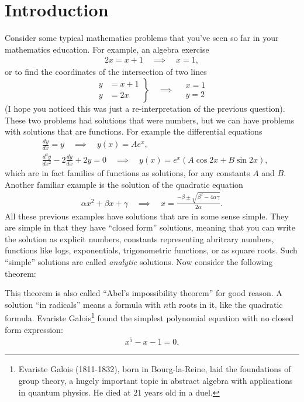 \chapter{Introduction} \label{ch:intro}
Consider some typical mathematics problems that you've seen so far in your mathematics education. For example, an algebra exercise
\begin{align}
2x = x + 1 \quad \implies \quad x=1,
\end{align}
or to find the coordinates of the intersection of two lines
\[
	\left.
	\begin{aligned}
	y &= x+1 \\
	y &= 2x
	\end{aligned}
	\right\}
	\quad \implies 	\quad
	\begin{aligned}
	x=1 \\
	y=2
	\end{aligned}
\]
(I hope you noticed this was just a re-interpretation of the previous question). These two problems had solutions that were numbers, but we can have problems with solutions that are functions. For example the differential equations
\begin{align}
& \frac{dy}{dx} = y \quad \implies \quad y(x) = A e^x, \\
& \frac{d^2y}{dx^2} - 2 \frac{dy}{dx} + 2y = 0 \quad \implies \quad y(x) = e^x \left( A \cos 2x + B \sin 2x\right),
\end{align}
which are in fact families of functions as solutions, for any constants $A$ and $B$. Another familiar example is the solution of the quadratic equation
\begin{align}
\alpha x^2 + \beta x + \gamma \quad \implies \quad x = \frac{-\beta \pm \sqrt{\beta^2 - 4\alpha\gamma}}{2\alpha}.
\end{align}
All these previous examples have solutions that are in some sense simple. They are simple in that they have ``closed form'' solutions, meaning that you can write the solution as explicit numbers, constants representing abritrary numbers, functions like logs, exponentials, trigonometric functions, or as square roots. Such ``simple'' solutions are called \textit{analytic} solutions. Now consider the following theorem:


This theorem is also called ``Abel's impossibility theorem'' for good reason. A solution ``in radicals'' means a formula with $n$th roots in it, like the quadratic formula. Evariste Galois\footnote{Evariste Galois (1811-1832), born in Bourg-la-Reine, laid the foundations of group theory, a hugely important topic in abstract algebra with applications in quantum physics. He died at 21 years old in a duel.} found the simplest polynomial equation with no closed form expression:
\begin{align*}
x^5 - x - 1 = 0.
\end{align*}

